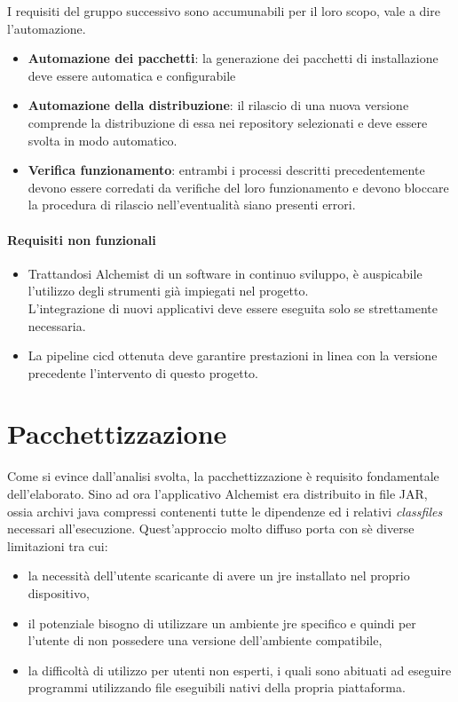 I requisiti del gruppo successivo sono accumunabili per il loro scopo, vale a dire l'automazione.

\begin{itemize}
	\item \textbf{Automazione dei pacchetti}: la generazione dei pacchetti di installazione deve essere automatica e configurabile
	\item \textbf{Automazione della distribuzione}: il rilascio di una nuova versione comprende la distribuzione di essa nei repository selezionati e deve essere svolta in modo automatico.
	\item \textbf{Verifica funzionamento}: entrambi i processi descritti precedentemente devono essere corredati da verifiche del loro funzionamento e devono bloccare la procedura di rilascio nell'eventualità siano presenti errori.
\end{itemize}

\paragraph{Requisiti non funzionali}

\begin{itemize}
	\item Trattandosi Alchemist di un software in continuo sviluppo, è auspicabile l'utilizzo degli strumenti già impiegati nel progetto. \\ L'integrazione di nuovi applicativi deve essere eseguita solo se strettamente necessaria.
	\item La pipeline \ac{cicd} ottenuta deve garantire prestazioni in linea con la versione precedente l'intervento di questo progetto.
\end{itemize}

\section{Pacchettizzazione}\label{sec:packaging}

Come si evince dall'analisi svolta, la pacchettizzazione è requisito fondamentale dell'elaborato. Sino ad ora l'applicativo Alchemist era distribuito in file JAR, ossia archivi java compressi contenenti tutte le dipendenze ed i relativi \textit{classfiles} necessari all'esecuzione. Quest'approccio molto diffuso porta con sè diverse limitazioni tra cui:
\begin{itemize}
	\item la necessità dell'utente scaricante di avere un \ac{jre} installato nel proprio dispositivo,
	\item il potenziale bisogno di utilizzare un ambiente \ac{jre} specifico e quindi per l'utente di non possedere una versione dell'ambiente compatibile,
	\item la difficoltà di utilizzo per utenti non esperti, i quali sono abituati ad eseguire programmi utilizzando file eseguibili nativi della propria piattaforma.
\end{itemize}

